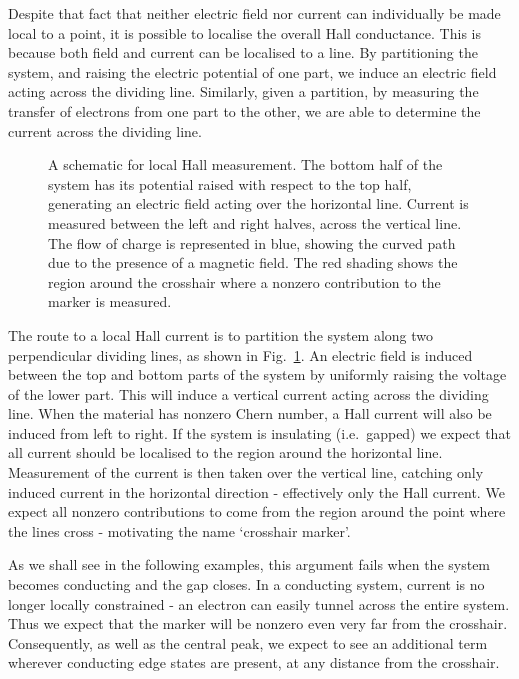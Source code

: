 Despite that fact that neither electric field nor current can individually be made local to a point, it is possible to localise the overall Hall conductance. This is because both field and current can be localised to a line. By partitioning the system, and raising the electric potential of one part, we induce an electric field acting across the dividing line. Similarly, given a partition, by measuring the transfer of electrons from one part to the other, we are able to determine the current across the dividing line.


\begin{figure} [t]
    \begin{center}
        \resizebox{0.45\columnwidth}{!}{}
        \caption[A schematic for local Hall measurement.]{A schematic for local Hall measurement. The bottom half of the system has its potential raised with respect to the top half, generating an electric field acting over the horizontal line. Current is measured between the left and right halves, across the vertical line. The flow of charge is represented in blue, showing the curved path due to the presence of a magnetic field. The red shading shows the region around the crosshair where a nonzero contribution to the marker is measured.}\label{fig:crosshair_quarters}
    \end{center}
\end{figure}%

The route to a local Hall current is to partition the system along two perpendicular dividing lines, as shown in Fig.~\ref{fig:crosshair_quarters}. An electric field is induced between the top and bottom parts of the system by uniformly raising the voltage of the lower part. This will induce a vertical current acting across the dividing line. When the material has nonzero Chern number, a Hall current will also be induced from left to right. If the system is insulating (i.e.~gapped) we expect that all current should be localised to the region around the horizontal line. Measurement of the current is then taken over the vertical line, catching only induced current in the horizontal direction - effectively only the Hall current. We expect all nonzero contributions to come from the region around the point where the lines cross - motivating the name `crosshair marker'.

As we shall see in the following examples, this argument fails when the system becomes conducting and the gap closes. In a conducting system, current is no longer locally constrained - an electron can easily tunnel across the entire system. Thus we expect that the marker will be nonzero even very far from the crosshair. Consequently, as well as the central peak, we expect to see an additional term wherever conducting edge states are present, at any distance from the crosshair. 

